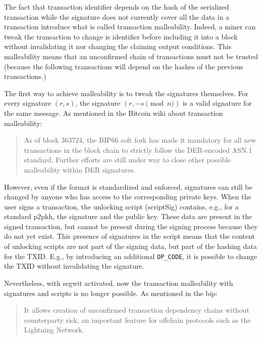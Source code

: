 The fact that transaction identifier depends on the hash of the serialized
transaction while the signature does not currently cover all the data in a
transaction introduce what is called transaction malleability. Indeed, a miner
can tweak the transaction to change is identifier before including it into a
block without invalidating it nor changing the claiming output conditions. This
malleability means that an unconfirmed chain of transactions must not be trusted
(because the following transactions will depend on the hashes of the previous
transactions.)

The first way to achieve malleability is to tweak the signatures themselves. For
every signature $(r, s)$, the signature $(r, -s \pmod n)$ is a valid signature
for the same message. As mentioned in the Bitcoin wiki about transaction
malleability:

\begin{quote}
	As of block 363724, the BIP66 soft fork has made it mandatory for all new
	transactions in the block chain to strictly follow the DER-encoded ASN.1 standard.
	Further efforts are still under way to close other possible malleability within
	DER signatures.
\end{quote}

However, even if the format is standardized and enforced, signatures can still
be changed by anyone who has access to the corresponding private keys. When the
user signs a transaction, the unlocking script (scriptSig) contains, e.g., for a
standard \gls{p2pkh}, the signature and the public key. These data are present
in the signed transaction, but cannot be present during the signing process
because they do not yet exist. This presence of signatures in the script means
that the content of unlocking scripts are not part of the signing data, but part
of the hashing data for the TXID. E.g., by introducing an additional
\texttt{OP\_CODE}, it is possible to change the TXID without invalidating the
signature.

Nevertheless, with \gls{segwit} activated, now the transaction malleability with
signatures and scripts is no longer possible. As mentioned in the \gls{bip}:

\begin{quote}
	It allows creation of unconfirmed transaction dependency chains without
	counterparty risk, an important feature for offchain protocols such as the
	Lightning Network.
\end{quote}


